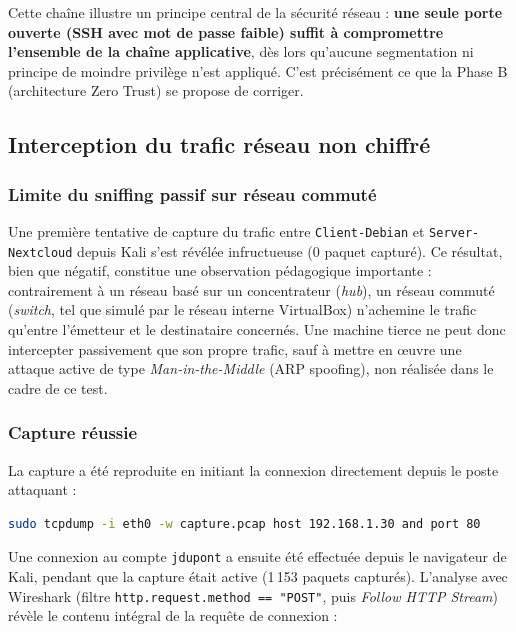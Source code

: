 Cette chaîne illustre un principe central de la sécurité réseau :
\textbf{une seule porte ouverte (SSH avec mot de passe faible) suffit à
compromettre l'ensemble de la chaîne applicative}, dès lors qu'aucune
segmentation ni principe de moindre privilège n'est appliqué. C'est
précisément ce que la Phase B (architecture Zero Trust) se propose de
corriger.

\subsection{Interception du trafic réseau non chiffré}
\label{sec:sniffing}

\subsubsection{Limite du sniffing passif sur réseau commuté}

Une première tentative de capture du trafic entre \texttt{Client-Debian}
et \texttt{Server-Nextcloud} depuis Kali s'est révélée infructueuse (0
paquet capturé). Ce résultat, bien que négatif, constitue une
observation pédagogique importante : contrairement à un réseau basé sur
un concentrateur (\emph{hub}), un réseau commuté (\emph{switch}, tel que
simulé par le réseau interne VirtualBox) n'achemine le trafic qu'entre
l'émetteur et le destinataire concernés. Une machine tierce ne peut donc
intercepter passivement que son propre trafic, sauf à mettre en œuvre
une attaque active de type \emph{Man-in-the-Middle} (ARP spoofing), non
réalisée dans le cadre de ce test.

\subsubsection{Capture réussie}

La capture a été reproduite en initiant la connexion directement depuis
le poste attaquant :

\begin{lstlisting}[language=bash, caption={Capture du trafic HTTP}]
sudo tcpdump -i eth0 -w capture.pcap host 192.168.1.30 and port 80
\end{lstlisting}

Une connexion au compte \texttt{jdupont} a ensuite été effectuée depuis
le navigateur de Kali, pendant que la capture était active (1\,153
paquets capturés). L'analyse avec Wireshark (filtre
\texttt{http.request.method == "POST"}, puis \emph{Follow HTTP Stream})
révèle le contenu intégral de la requête de connexion :

